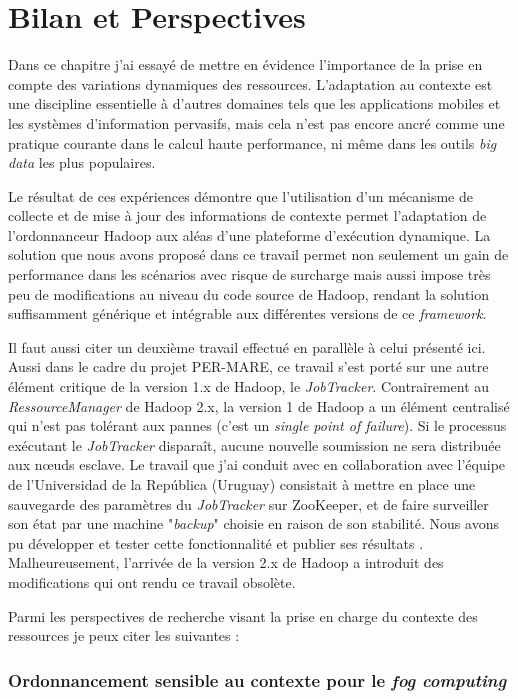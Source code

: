 \section{Bilan et Perspectives}

Dans ce chapitre j'ai essayé de mettre en évidence l'importance de la prise en compte des variations dynamiques des ressources. L'adaptation au contexte est une discipline essentielle à d'autres domaines tels que les applications mobiles et  les systèmes d'information pervasifs, mais cela n'est pas encore ancré comme une pratique courante dans le calcul haute performance, ni même dans les outils \textit{big data} les plus populaires. 

Le résultat de ces expériences démontre que l'utilisation d'un mécanisme de collecte et de mise à jour des informations de contexte permet l'adaptation de l'ordonnanceur Hadoop aux aléas d'une plateforme d'exécution dynamique. La solution que nous avons proposé dans ce travail permet non seulement un gain de performance dans les scénarios avec risque de surcharge mais aussi impose très peu de modifications au niveau du code source de Hadoop, rendant la solution suffisamment générique et intégrable aux différentes versions de ce \textit{framework}. 

Il faut aussi citer un deuxième travail effectué en parallèle à celui présenté ici. Aussi dans le cadre du projet PER-MARE, ce travail s'est porté sur une autre élément critique de la version 1.x de Hadoop, le \textit{JobTracker}. Contrairement au \textit{RessourceManager} de Hadoop 2.x, la version 1 de Hadoop a un élément centralisé qui n'est pas tolérant aux pannes (c'est un \textit{single point of failure}). Si le processus exécutant le \textit{JobTracker} disparaît, aucune nouvelle soumission ne sera distribuée aux n{\oe}uds esclave. Le travail que j'ai conduit avec en collaboration avec l'équipe de l'Universidad de la República (Uruguay) consistait à mettre en place une sauvegarde des paramètres du \textit{JobTracker} sur ZooKeeper, et de faire surveiller son état par une machine "\textit{backup}" choisie en raison de son stabilité. Nous avons pu développer et tester cette fonctionnalité et publier ses résultats \cite{Steffenel2015-WoC, Rey14a}. Malheureusement, l'arrivée de la version 2.x de Hadoop a introduit des modifications qui ont rendu ce travail obsolète. 

Parmi les perspectives de recherche visant la prise en charge du contexte des ressources je peux citer les suivantes :

\subsubsection*{Ordonnancement sensible au contexte pour le \textit{fog computing}}

